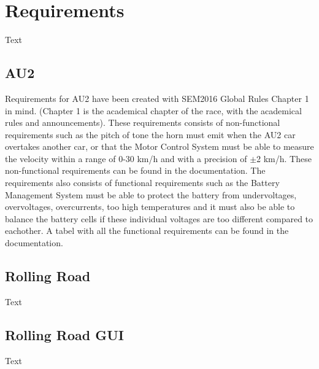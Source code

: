 \chapter{Requirements}
Text

\section{AU2}
Requirements for AU2 have been created with SEM2016 Global Rules Chapter 1 in mind. (Chapter 1 is the academical chapter of the race, with the academical rules and announcements). These requirements consists of non-functional requirements such as the pitch of tone the horn must emit when the AU2 car overtakes another car, or that the Motor Control System must be able to measure the velocity within a range of 0-30 km/h and with a precision of $\pm$2 km/h. These non-functional requirements can be found in the documentation. The requirements also consists of functional requirements such as the Battery Management System must be able to protect the battery from undervoltages, overvoltages, overcurrents, too high temperatures and it must also be able to balance the battery cells if these individual voltages are too different compared to eachother. A tabel with all the functional requirements can be found in the documentation.

\section{Rolling Road}
Text

\section{Rolling Road GUI}
Text